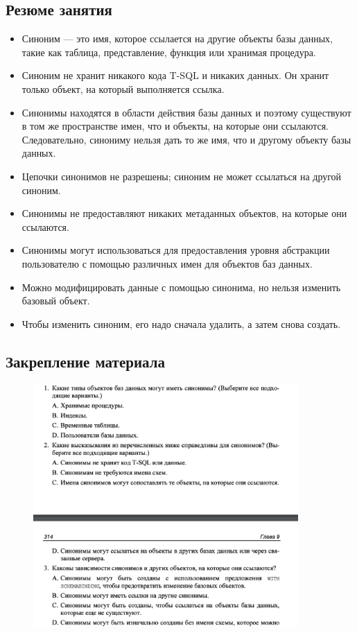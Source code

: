 \subsection*{Резюме занятия}
\begin{itemize}
	\item Синоним — это имя, которое ссылается на другие объекты базы данных, такие
	как таблица, представление, функция или хранимая процедура. 
	\item Синоним не хранит никакого кода T-SQL и никаких данных. Он хранит только
	объект, на который выполняется ссылка.
	\item Синонимы находятся в области действия базы данных и поэтому существуют
	в том же пространстве имен, что и объекты, на которые они ссылаются. Следовательно, синониму нельзя дать то же имя, что и другому объекту базы данных. 
	\item Цепочки синонимов не разрешены; синоним не может ссылаться на другой
	синоним. 
	\item Синонимы не предоставляют никаких метаданных объектов, на которые они
	ссылаются. 
	\item Синонимы могут использоваться для предоставления уровня абстракции пользователю с помощью различных имен для объектов баз данных. 
	\item Можно модифицировать данные с помощью синонима, но нельзя изменить
	базовый объект. 
	\item Чтобы изменить синоним, его надо сначала удалить, а затем снова создать. 
\end{itemize}


\subsection*{Закрепление материала}

\begin{figure}[h!]
	\begin{center}
		\includegraphics[width=0.9\textwidth]{img/zakrep18.png}
	\end{center}
	\captionsetup{justification=centering}
\end{figure}
\clearpage

